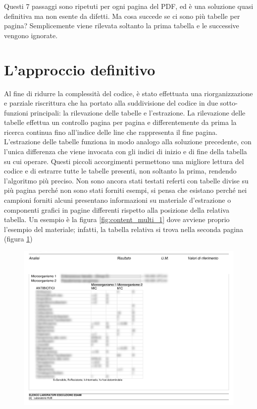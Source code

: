 Questi 7 passaggi sono ripetuti per ogni pagina del PDF, ed è una soluzione quasi definitiva ma non esente da difetti. Ma cosa succede se ci sono più tabelle per pagina? Semplicemente viene rilevata soltanto la prima tabella e le successive vengono ignorate.
\section{L'approccio definitivo}
Al fine di ridurre la complessità del codice, è stato effettuata una riorganizzazione e parziale riscrittura che ha portato alla suddivisione del codice in due sotto-funzioni principali: la rilevazione delle tabelle e l'estrazione.
La rilevazione delle tabelle effettua un controllo pagina per pagina e differentemente da prima la ricerca continua fino all'indice delle line che rappresenta il fine pagina.
L'estrazione delle tabelle funziona in modo analogo alla soluzione precedente, con l'unica differenza che viene invocata con gli indici di inizio e di fine della tabella su cui operare. 
Questi piccoli accorgimenti permettono una migliore lettura del codice e di estrarre tutte le tabelle presenti, non soltanto la prima, rendendo l'algoritmo più preciso.
Non sono ancora stati testati referti con tabelle divise su più pagina perché non sono stati forniti esempi, si pensa che esistano perché nei campioni forniti alcuni presentano informazioni su materiale d'estrazione o componenti grafici in pagine differenti rispetto alla posizione della relativa tabella. Un esempio è la figura \ref{fig:content_multi_1} dove avviene proprio l'esempio del materiale; infatti, la tabella relativa si trova nella seconda pagina (figura \ref{fig:content_multi_2})
\newpage
\begin{figure}[h!]
	\centering
	\includegraphics[width=.99\columnwidth]{images/content_multi_p2.png}
	\caption{\textit{}}
	\label{fig:content_multi_2}
\end{figure} 

